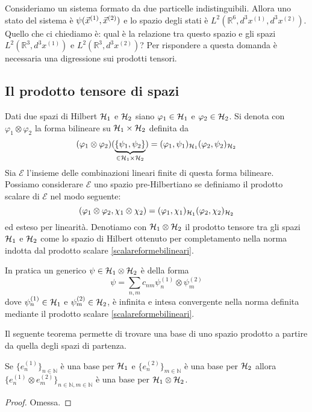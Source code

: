 \documentclass[../../FisicaTeorica.tex]{subfiles}
\begin{document}
Consideriamo un sistema formato da due particelle indistinguibili. Allora uno stato del sistema è $\psi(\vec x^{(1)}, \vec x^{(2)})$ e lo spazio degli stati è $L^2(\mathbb R^6, d^3 x^{(1)}, d^3 x^{(2)})$. Quello che ci chiediamo è: qual è la relazione tra questo spazio e gli spazi $L^2(\mathbb R^3, d^3 x^{(1)})$ e $L^2(\mathbb R^3, d^3 x^{(2)})$? Per rispondere a questa domanda è necessaria una digressione sui prodotti tensori.

\subsection{Il prodotto tensore di spazi}

\begin{dfn}
Dati due spazi di Hilbert $\mathcal{H}_1$ e $\mathcal{H}_2$ siano $\varphi_1 \in \mathcal{H}_1$ e $\varphi_2 \in \mathcal{H}_2$. Si denota con $\varphi_1 \otimes \varphi_2$ la forma bilineare su $\mathcal{H}_1 \times \mathcal{H}_2$ definita da
\[
(\varphi_1 \otimes \varphi_2) (\underbrace{\{ \psi_1 , \psi_2 \}}_{\in \mathcal{H}_1 \times \mathcal{H}_2}) = (\varphi_1, \psi_1)_{\mathcal{H}_1} (\varphi_2, \psi_2)_{\mathcal{H}_2} 
\]
Sia $\mathcal E$ l’insieme delle combinazioni lineari finite di questa forma bilineare. Possiamo considerare $\mathcal E$ uno spazio pre-Hilbertiano se definiamo il prodotto scalare di $\mathcal E$ nel modo seguente:
\begin{equation}
\label{eqn:scalareformebilineari}
(\varphi_1 \otimes \varphi_2, \chi_1 \otimes \chi_2) = (\varphi_1, \chi_1)_{\mathcal{H}_1} (\varphi_2, \chi_2)_{\mathcal{H}_2}
\end{equation}
ed esteso per linearità. Denotiamo con $\mathcal{H}_1 \otimes \mathcal{H}_2$ il prodotto tensore tra gli spazi $\mathcal{H}_1$ e $\mathcal{H}_2$ come lo spazio di Hilbert ottenuto per completamento nella norma indotta dal prodotto scalare \eqref{scalareformebilineari}.
\end{dfn}

In pratica un generico $\psi \in \mathcal{H}_1 \otimes \mathcal{H}_2$ è della forma
\[
\psi = \sum_{n,m} c_{nm} \psi_n^{(1)} \otimes \psi_m^{(2)}
\]
dove $\psi_n^{(1)} \in \mathcal{H}_1$ e $\psi_m^{(2)} \in \mathcal{H}_2$, è infinita e intesa convergente nella norma definita mediante il prodotto scalare \eqref{scalareformebilineari}.

Il seguente teorema permette di trovare una base di uno spazio prodotto a partire da quella degli spazi di partenza.
\begin{thm}
Se $\{e_n^{(1)}\}_{n \in \mathbb N}$ è una base per $\mathcal{H}_1$ e $\{e_n^{(2)}\}_{m \in \mathbb N}$ è una base per $\mathcal{H}_2$ allora $\{e_n^{(1)} \otimes e_m^{(2)}\}_{n \in \mathbb N, m \in \mathbb N}$ è una base per $\mathcal{H}_1 \otimes \mathcal{H}_2$.
\end{thm}
\begin{proof}
Omessa.
\end{proof}
\end{document}
